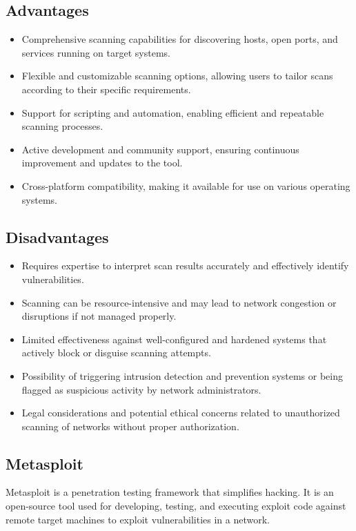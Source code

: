 \documentclass[11pt]{article}
\begin{document}
\subsection{Advantages}
\begin{itemize}
    \item Comprehensive scanning capabilities for discovering hosts, open ports, and services running on target systems.
    \item Flexible and customizable scanning options, allowing users to tailor scans according to their specific requirements.
    \item Support for scripting and automation, enabling efficient and repeatable scanning processes.
    \item Active development and community support, ensuring continuous improvement and updates to the tool.
    \item Cross-platform compatibility, making it available for use on various operating systems.
\end{itemize}

\subsection{Disadvantages}
\begin{itemize}
    \item Requires expertise to interpret scan results accurately and effectively identify vulnerabilities.
    \item Scanning can be resource-intensive and may lead to network congestion or disruptions if not managed properly.
    \item Limited effectiveness against well-configured and hardened systems that actively block or disguise scanning attempts.
    \item Possibility of triggering intrusion detection and prevention systems or being flagged as suspicious activity by network administrators.
    \item Legal considerations and potential ethical concerns related to unauthorized scanning of networks without proper authorization.
\end{itemize}

\subsection{Metasploit}
Metasploit is a penetration testing framework that simplifies hacking. It is an open-source tool used for developing, testing, and executing exploit code against remote target machines to exploit vulnerabilities in a network.
\end{document}
